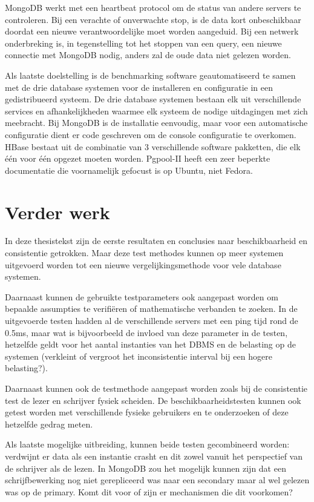 MongoDB werkt met een heartbeat protocol om de status van andere servers te controleren. Bij een verachte of onverwachte stop, is de data kort onbeschikbaar doordat een nieuwe verantwoordelijke moet worden aangeduid. Bij een netwerk onderbreking is, in tegenstelling tot het stoppen van een query, een nieuwe connectie met MongoDB nodig, anders zal de oude data niet gelezen worden. 

Als laatste doelstelling is de benchmarking software geautomatiseerd te samen met de drie database systemen voor de installeren en configuratie in een gedistribueerd systeem. De drie database systemen bestaan elk uit verschillende services en afhankelijkheden waarmee elk systeem de nodige uitdagingen met zich meebracht. Bij MongoDB is de installatie eenvoudig,  maar voor een automatische configuratie dient er code geschreven om de console configuratie te overkomen. HBase bestaat uit de combinatie van 3 verschillende software pakketten, die elk één voor één opgezet moeten worden. Pgpool-II heeft een zeer beperkte documentatie die voornamelijk gefocust is op Ubuntu, niet Fedora. 
\section{Verder werk}
In deze thesistekst zijn de eerste resultaten en conclusies naar beschikbaarheid en consistentie getrokken. Maar deze test methodes kunnen op meer systemen uitgevoerd worden tot een nieuwe vergelijkingsmethode voor vele database systemen.

Daarnaast kunnen de gebruikte testparameters ook aangepast worden om bepaalde assumpties te verifiëren of mathematische verbanden te zoeken. In de uitgevoerde testen hadden al de verschillende servers met een ping tijd rond de 0.5ms, maar wat is bijvoorbeeld de invloed van deze parameter in de testen, hetzelfde geldt voor het aantal instanties van het DBMS en de belasting op de systemen (verkleint of vergroot het inconsistentie interval bij een hogere belasting?). 

Daarnaast kunnen ook de testmethode aangepast worden zoals bij de consistentie test de lezer en schrijver fysiek scheiden. De beschikbaarheidstesten kunnen ook getest worden met verschillende fysieke gebruikers en te onderzoeken of deze hetzelfde gedrag meten. 

Als laatste mogelijke uitbreiding, kunnen beide testen gecombineerd worden: verdwijnt er data als een instantie crasht en dit zowel vanuit het perspectief van de schrijver als de lezen. In MongoDB zou het mogelijk kunnen zijn dat een schrijfbewerking nog niet gerepliceerd was naar een secondary maar al wel gelezen was op de primary. Komt dit voor of zijn er mechanismen die dit voorkomen?  
